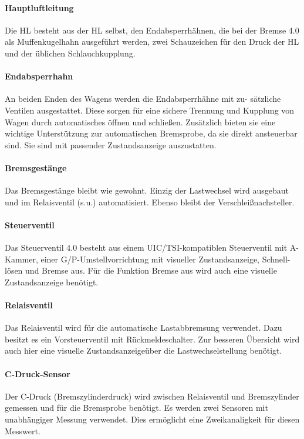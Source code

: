 \paragraph{Hauptluftleitung} Die \gls{HL} besteht aus der \gls{HL} selbst, den Endabsperrhähnen, die bei der \gls{Bremse 4.0} als Muffenkugelhahn ausgeführt werden, zwei Schauzeichen für den Druck der \gls{HL} und der üblichen Schlauchkupplung.

\paragraph{Endabsperrhahn} \label{sec:Endabsperrhahn}
An beiden Enden des Wagens werden die Endabsperrhähne mit zu- sätzliche Ventilen ausgestattet. Diese sorgen für eine sichere Trennung und Kupplung von Wagen durch automatisches öffnen und schließen. Zusätzlich bieten sie eine wichtige Unterstützung zur automatischen \gls{Bremsprobe}, da sie direkt ansteuerbar sind. Sie sind mit passender Zustandsanzeige auszustatten.

\paragraph{Bremsgestänge} Das Bremsgestänge bleibt wie gewohnt. Einzig der \gls{Lastwechsel} wird ausgebaut und im Relaisventil (s.u.) automatisiert. Ebenso bleibt der Verschleißnachsteller.

\paragraph{Steuerventil}\label{sec:Bremsart}
Das Steuerventil 4.0 besteht aus einem UIC/\acrshort{TSI}-kompatiblen Steuerventil mit A-Kammer, einer G/P-Umstellvorrichtung mit visueller Zustandsanzeige, Schnell- lösen und Bremse aus. Für die Funktion Bremse aus wird auch eine visuelle Zustandsanzeige benötigt.

\paragraph{Relaisventil} Das Relaisventil wird für die automatische Lastabbremsung verwendet. Dazu besitzt es ein Vorsteuerventil mit Rückmeldeschalter. Zur besseren Übersicht wird auch hier eine visuelle Zustandsanzeigeüber die \gls{Lastwechsel}stellung benötigt.

\paragraph{C-Druck-Sensor} \label{sec:C-Druck}
Der C-Druck (Bremszylinderdruck) wird zwischen Relaisventil und Bremszylinder gemessen und für die \gls{Bremsprobe} benötigt. Es werden zwei Sensoren mit unabhängiger Messung verwendet. Dies ermöglicht eine Zweikanaligkeit für diesen Messwert.

